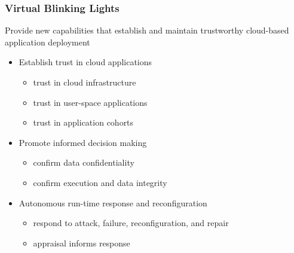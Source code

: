 \documentclass{beamer}
\begin{document}
\begin{frame}
  \frametitle{Virtual Blinking Lights}
  Provide new capabilities that establish and maintain trustworthy
  cloud-based application deployment
  \medskip
  \medskip
  \begin{itemize}
  \item Establish trust in cloud applications
    \begin{itemize}
    \item trust in cloud infrastructure
    \item trust in user-space applications 
    \item trust in application cohorts
    \end{itemize}
  \item Promote informed decision making
    \begin{itemize}
    \item confirm data confidentiality
    \item confirm execution and data integrity
    \end{itemize}
  \item Autonomous run-time response and reconfiguration
    \begin{itemize}
    \item respond to attack, failure, reconfiguration, and repair 
    \item appraisal informs response
    \end{itemize}
  \end{itemize}
\end{frame}
\end{document}
